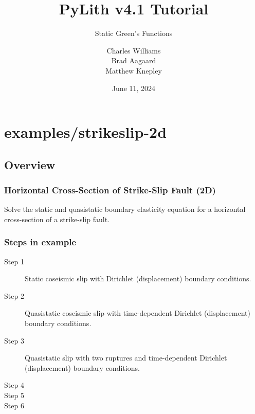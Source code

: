 \documentclass[aspectratio=169]{beamer}
\title{PyLith v4.1 Tutorial}
\subtitle{Static Green's Functions}
\author{Charles Williams \\
  Brad Aagaard \\
  Matthew Knepley}
\institute{\texttt{[image: ../../logos/cig\_logo\_dots]}%
  \hspace{4em}%
\raisebox{1em}{\texttt{[image: ../../logos/cig\_short\_pylith]}}}
\date{June 11, 2024}
\begin{document}
\maketitle


\section{{\ttfamily examples/strikeslip-2d}}

\subsection{Overview}

\begin{frame}
  \frametitle{Horizontal Cross-Section of Strike-Slip Fault (2D)}
  \summary{}


  \vfill
  Solve the static and quasistatic boundary elasticity equation for a horizontal cross-section of a strike-slip fault.
  
\end{frame}


\begin{frame}
  \frametitle{Steps in example}
  \summary{}

  \begin{description}
    \item[Step 1] Static coseismic slip with Dirichlet (displacement) boundary conditions.
    \item[Step 2] Quasistatic coseismic slip with time-dependent Dirichlet (displacement) boundary conditions.
    \item[Step 3] Quasistatic slip with two ruptures and time-dependent Dirichlet (displacement) boundary conditions.
    \item[Step 4] 
    \item[Step 5] 
    \item[Step 6] 
  \end{description}
  
\end{frame}
\end{document}
